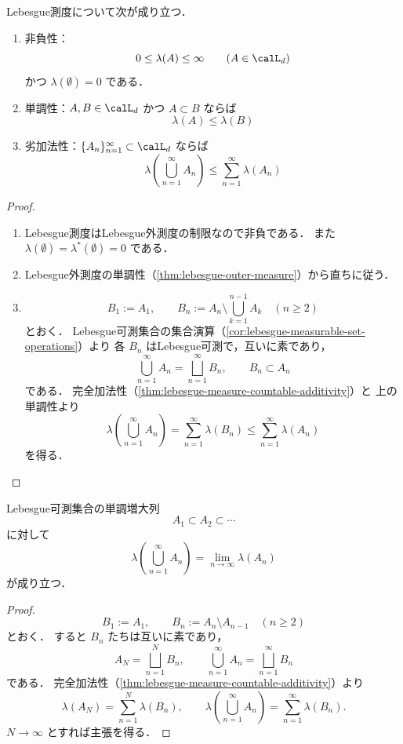 \begin{theorem}[基本性質]\label{thm:lebesgue-measure-basic}
Lebesgue測度について次が成り立つ．
\begin{enumerate}
    \item 非負性：
    \[
    0\le \lambda(A)\le\infty
    \qquad(A\in\calL_d)
    \]
    かつ $\lambda(\emptyset)=0$ である．
    \item 単調性：$A,B\in\calL_d$ かつ $A\subset B$ ならば
    \[
    \lambda(A)\le \lambda(B)
    \]
    \item 劣加法性：$\{A_n\}_{n=1}^{\infty}\subset\calL_d$ ならば
    \[
    \lambda\left(\bigcup_{n=1}^{\infty}A_n\right)
    \le
    \sum_{n=1}^{\infty}\lambda(A_n)
    \]
\end{enumerate}
\end{theorem}
\begin{proof}
\begin{enumerate}
    \item Lebesgue測度はLebesgue外測度の制限なので非負である．
    また $\lambda(\emptyset)=\lambda^*(\emptyset)=0$ である．

    \item Lebesgue外測度の単調性（\cref{thm:lebesgue-outer-measure}）から直ちに従う．

    \item
    \[
    B_1:=A_1,\qquad
    B_n:=A_n\setminus\bigcup_{k=1}^{n-1}A_k\quad(n\ge2)
    \]
    とおく．
    Lebesgue可測集合の集合演算（\cref{cor:lebesgue-measurable-set-operations}）より
    各 $B_n$ はLebesgue可測で，互いに素であり，
    \[
    \bigcup_{n=1}^{\infty}A_n=\bigsqcup_{n=1}^{\infty}B_n,
    \qquad
    B_n\subset A_n
    \]
    である．
    完全加法性（\cref{thm:lebesgue-measure-countable-additivity}）と
    上の単調性より
    \[
    \lambda\left(\bigcup_{n=1}^{\infty}A_n\right)
    =
    \sum_{n=1}^{\infty}\lambda(B_n)
    \le
    \sum_{n=1}^{\infty}\lambda(A_n)
    \]
    を得る．
\end{enumerate}
\end{proof}

\begin{theorem}[下からの連続性]\label{thm:lebesgue-measure-continuity-from-below}
Lebesgue可測集合の単調増大列
\[
A_1\subset A_2\subset\cdots
\]
に対して
\[
\lambda\left(\bigcup_{n=1}^{\infty}A_n\right)
=
\lim_{n\to\infty}\lambda(A_n)
\]
が成り立つ．
\end{theorem}
\begin{proof}
\[
B_1:=A_1,\qquad
B_n:=A_n\setminus A_{n-1}\quad(n\ge2)
\]
とおく．
すると $B_n$ たちは互いに素であり，
\[
A_N=\bigsqcup_{n=1}^{N}B_n,
\qquad
\bigcup_{n=1}^{\infty}A_n=\bigsqcup_{n=1}^{\infty}B_n
\]
である．
完全加法性（\cref{thm:lebesgue-measure-countable-additivity}）より
\[
\lambda(A_N)=\sum_{n=1}^{N}\lambda(B_n),
\qquad
\lambda\left(\bigcup_{n=1}^{\infty}A_n\right)
=
\sum_{n=1}^{\infty}\lambda(B_n).
\]
$N\to\infty$ とすれば主張を得る．
\end{proof}

